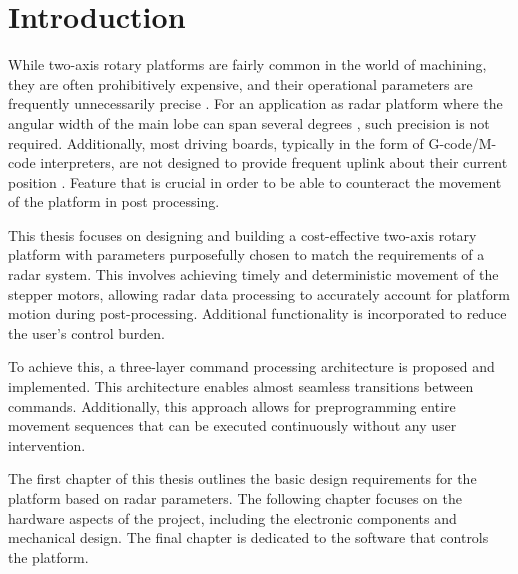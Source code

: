 
\chapter*{Introduction}

While two-axis rotary platforms are fairly common in the world of machining, they are often prohibitively expensive, and their operational parameters are frequently unnecessarily precise \cite{carl}.
For an application as radar platform where the angular width of the main lobe can span several degrees \cite{sidarMAN}, such precision is not required.
Additionally, most driving boards, typically in the form of G-code/M-code interpreters, are not designed to provide frequent uplink about their current position \cite{duet}.
Feature that is crucial in order to be able to counteract the movement of the platform in post processing.

This thesis focuses on designing and building a cost-effective two-axis rotary platform with parameters purposefully chosen to match the requirements of a radar system.
This involves achieving timely and deterministic movement of the stepper motors, allowing radar data processing to accurately account for platform motion during post-processing.
Additional functionality is incorporated to reduce the user’s control burden.

To achieve this, a three-layer command processing architecture is proposed and implemented.
This architecture enables almost seamless transitions between commands.
Additionally, this approach allows for preprogramming entire movement sequences that can be executed continuously without any user intervention.

The first chapter of this thesis outlines the basic design requirements for the platform based on radar parameters.
The following chapter focuses on the hardware aspects of the project, including the electronic components and mechanical design.
The final chapter is dedicated to the software that controls the platform.
